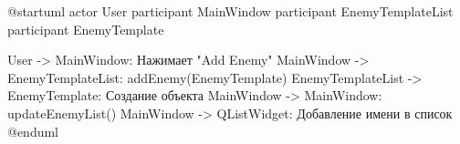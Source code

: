 @startuml
actor User
participant MainWindow
participant EnemyTemplateList
participant EnemyTemplate

User -> MainWindow: Нажимает "Add Enemy"
MainWindow -> EnemyTemplateList: addEnemy(EnemyTemplate)
EnemyTemplateList -> EnemyTemplate: Создание объекта
MainWindow -> MainWindow: updateEnemyList()
MainWindow -> QListWidget: Добавление имени в список
@enduml
